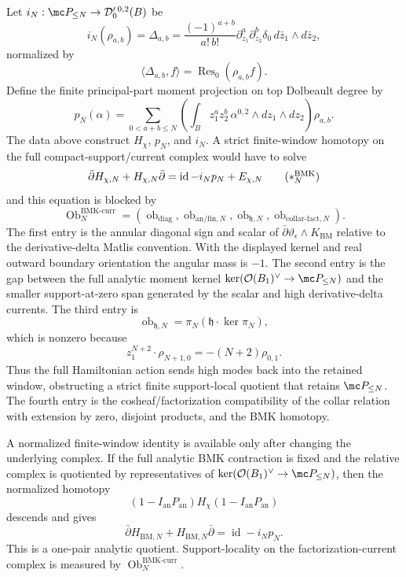 \begin{thm}
  Let \(i_N:\mc P_{\leq N}\to\mathcal D'_0{}^{0,2}(B)\) be
  \[
    i_N(\rho_{a,b})=\Delta_{a,b}
      =
      \frac{(-1)^{a+b}}{a!\,b!}
      \partial_{z_1}^a\partial_{z_2}^b
      \delta_0\,d\bar z_1\wedge d\bar z_2,
  \]
  normalized by
  \[
    \langle\Delta_{a,b},f\rangle
      =
      \operatorname{Res}_0(\rho_{a,b}f).
  \]
  Define the finite principal-part moment projection on top Dolbeault
  degree by
  \[
    p_N(\alpha)
      =
      \sum_{0<a+b\leq N}
      \left(
        \int_B z_1^az_2^b\,
        \alpha^{0,2}\wedge dz_1\wedge dz_2
      \right)\rho_{a,b}.
  \]
  The data above construct \(H_\chi\), \(p_N\), and \(i_N\).  A strict
  finite-window homotopy on the full compact-support/current complex
  would have to solve
  \[
    \bar\partial H_{\chi,N}
    +H_{\chi,N}\bar\partial
    =
    \operatorname{id}-i_Np_N+E_{\chi,N}
  \tag{\(\ast_N^{\mathrm{BMK}}\)}
  \]
  and this equation is blocked by
  \[
    \operatorname{Ob}^{\mathrm{BMK\mbox{-}curr}}_N
    =
    \left(
      \operatorname{ob}_{\mathrm{diag}},
      \operatorname{ob}_{\mathrm{an}/\mathrm{fin},N},
      \operatorname{ob}_{\mathfrak h,N},
      \operatorname{ob}_{\mathrm{collar\mbox{-}fact},N}
    \right).
  \]
  The first entry is the annular diagonal sign and scalar of
  \(\bar\partial\vartheta_\epsilon\wedge K_{\mathrm{BM}}\) relative to
  the derivative-delta Matlis convention.  With the displayed kernel and
  real outward boundary orientation the angular mass is \(-1\).  The
  second entry is the gap between the full analytic moment kernel
  \(\ker(\mathcal O(B_1)^\vee\to\mc P_{\le N})\) and the smaller
  support-at-zero span generated by the scalar and high derivative-delta
  currents.  The third entry is
  \[
    \operatorname{ob}_{\mathfrak h,N}
      =
    \pi_N(\mathfrak h\cdot\ker\pi_N),
  \]
  which is nonzero because
  \[
    z_1^{N+2}\cdot\rho_{N+1,0}=-(N+2)\rho_{0,1}.
  \]
  Thus the full Hamiltonian action sends high modes back into the retained
  window, obstructing a strict finite support-local quotient that retains
  \(\mc P_{\le N}\).  The fourth entry is the cosheaf/factorization
  compatibility of the collar relation with extension by zero, disjoint
  products, and the BMK homotopy.

  A normalized finite-window identity is available only after changing
  the underlying complex.  If the full analytic BMK contraction is fixed and the
  relative complex is quotiented by representatives of
  \(\ker(\mathcal O(B_1)^\vee\to\mc P_{\le N})\), then the normalized
  homotopy
  \[
    (1-I_{\mathrm{an}}P_{\mathrm{an}})H_\chi
    (1-I_{\mathrm{an}}P_{\mathrm{an}})
  \]
  descends and gives
  \[
    \bar\partial H_{\mathrm{BM},N}
    +H_{\mathrm{BM},N}\bar\partial
    =
    \operatorname{id}-i_Np_N .
  \]
  This is a one-pair analytic quotient.  Support-locality on the
  factorization-current complex is measured by
  \(\operatorname{Ob}^{\mathrm{BMK\mbox{-}curr}}_N\).


\end{thm}

